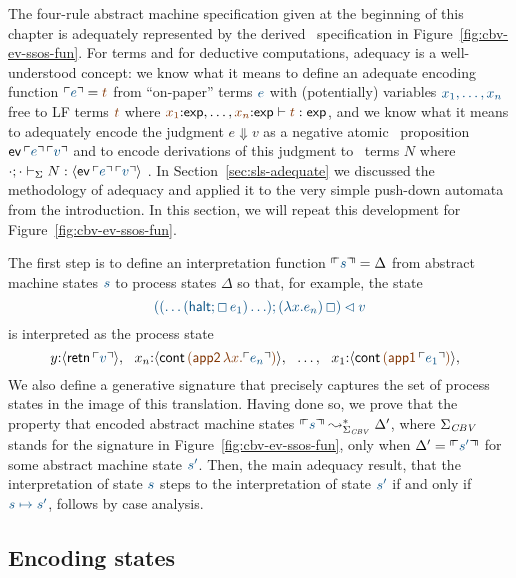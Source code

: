 The four-rule abstract machine specification given at the
beginning of this chapter is adequately represented by the derived
\sls~specification in Figure~\ref{fig:cbv-ev-ssos-fun}. For terms and
for deductive computations, adequacy is a well-understood concept: we
know what it means to define an adequate encoding function $\interp{e}
= \lf{t}$ from ``on-paper'' terms $\obj{e}$ with (potentially) variables
$\obj{x_1,\ldots,x_n}$ free to LF terms $\lf{t}$ where $\lf{x_1}{:}{\sf
  exp},\ldots,\lf{x_n}{:}{\sf exp} \vdash \lf{t} : {\sf exp}$, and we know what
it means to adequately encode the judgment $e \Downarrow v$ as a
negative atomic \sls~proposition ${\sf ev}\,\interp{e}\,\interp{v}$
and to encode derivations of this judgment to \sls~terms $N$ where
$\slst{\Sigma}{\cdot}{\cdot}{N}{\susp{{\sf
      ev}\,\interp{e}\,\interp{v}}}$
\cite{harper93framework,harper07mechanizing}. 
%
In Section~\ref{sec:sls-adequate} we discussed the methodology of 
adequacy and applied it to the very simple push-down automata from the 
introduction. In this section, we will repeat this development
for Figure~\ref{fig:cbv-ev-ssos-fun}.

The
first step is to define an interpretation function 
$\ctxinterp{s} = \Delta$ from 
abstract machine states $\obj{s}$
to process states $\Delta$ so that, for example, the
state
\[
\obj{((\ldots({\sf halt}; \Box\,e_1)\ldots); (\lambda x.e_n)\,\Box) \lhd v}
\]
is interpreted as the process state
\[
y{:}\susp{{\sf retn}\,\interp{v}}, ~~
x_n{:}\susp{{\sf cont}\,\lf{({\sf app2}\,\lambda x.\interp{e_n})}}, ~~
\ldots, ~~
x_1{:}\susp{{\sf cont}\,\lf{({\sf app1}\,\interp{e_1})}}, ~~
\]
We also define a generative signature that precisely captures the set
of process states in the image of this translation. Having done so, we
prove that the property that encoded abstract machine states
$\ctxinterp{s} \leadsto^*_{\Sigma_{\it CBV}} \Delta'$, where $\Sigma_{\it CBV}$ 
stands for the signature in Figure~\ref{fig:cbv-ev-ssos-fun}, 
only when 
$\Delta' = \ctxinterp{s'}$ for some abstract machine state
$\obj{s'}$. Then, the main adequacy result, that the interpretation of
state $\obj{s}$ steps to the interpretation of state $\obj{s'}$ if and only if 
$\obj{s \mapsto s'}$, follows by case analysis.


\subsection{Encoding states}


